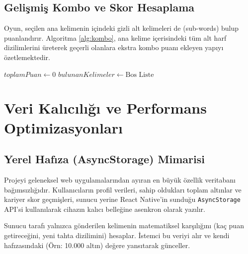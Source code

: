 \documentclass[conference,a4paper]{IEEEtran}
\begin{document}
\subsection{Gelişmiş Kombo ve Skor Hesaplama}
Oyun, seçilen ana kelimenin içindeki gizli alt kelimeleri de (sub-words) bulup puanlandırır. Algoritma \ref{alg:kombo}, ana kelime içerisindeki tüm alt harf dizilimlerini üreterek geçerli olanlara ekstra kombo puanı ekleyen yapıyı özetlemektedir.

\begin{algorithm}[H]
\caption{Trie Üzerinde Kelime ve Kombo Doğrulama}
\label{alg:kombo}
$toplamPuan \gets 0$\;
$bulunanKelimeler \gets \text{Bos Liste}$\;


\;
\end{algorithm}

\section{Veri Kalıcılığı ve Performans Optimizasyonları}

\subsection{Yerel Hafıza (AsyncStorage) Mimarisi}
Projeyi geleneksel web uygulamalarından ayıran en büyük özellik veritabanı bağımsızlığıdır. Kullanıcıların profil verileri, sahip oldukları toplam altınlar ve kariyer skor geçmişleri, sunucu yerine React Native'in sunduğu \texttt{AsyncStorage} API'si kullanılarak cihazın kalıcı belleğine asenkron olarak yazılır. 

Sunucu tarafı yalnızca gönderilen kelimenin matematiksel karşılığını (kaç puan getireceğini, yeni tahta dizilimini) hesaplar. İstemci bu veriyi alır ve kendi hafızasındaki (Örn: 10.000 altın) değere yansıtarak günceller.
\end{document}
